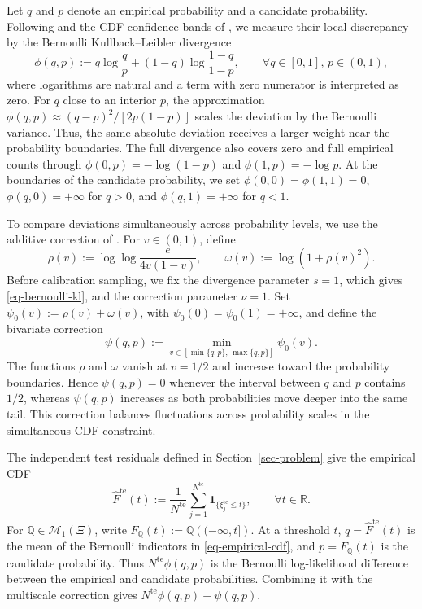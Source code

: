 \documentclass[review,11pt,3p,authoryear,nopreprintline]{elsarticle}
\begin{document}
Let $q$ and $p$ denote an empirical probability and a candidate probability. Following \citet{B.J79} and the CDF confidence bands of \citet{O95}, we measure their local discrepancy by the Bernoulli Kullback--Leibler divergence
\begin{equation}
  \phi(q,p):=q\log\frac{q}{p}+(1-q)\log\frac{1-q}{1-p},\qquad \forall q\in[0,1],\, p\in(0,1),
  \label{eq-bernoulli-kl}
\end{equation}
where logarithms are natural and a term with zero numerator is interpreted as zero. For $q$ close to an interior $p$, the approximation $\phi(q,p)\approx(q-p)^2/[2p(1-p)]$ scales the deviation by the Bernoulli variance. Thus, the same absolute deviation receives a larger weight near the probability boundaries. The full divergence also covers zero and full empirical counts through $\phi(0,p)=-\log(1-p)$ and $\phi(1,p)=-\log p$. At the boundaries of the candidate probability, we set $\phi(0,0)=\phi(1,1)=0$, $\phi(q,0)=+\infty$ for $q>0$, and $\phi(q,1)=+\infty$ for $q<1$.

To compare deviations simultaneously across probability levels, we use the additive correction of \citet{L.J23}. For $v\in(0,1)$, define
\begin{equation*}
  \rho(v):=\log\log\frac{e}{4v(1-v)},\qquad \omega(v):=\log\!\left(1+\rho(v)^2\right).
\end{equation*}
Before calibration sampling, we fix the divergence parameter $s=1$, which gives \eqref{eq-bernoulli-kl}, and the correction parameter $\nu=1$. Set $\psi_0(v):=\rho(v)+\omega(v)$, with $\psi_0(0)=\psi_0(1)=+\infty$, and define the bivariate correction
\begin{equation*}
  \psi(q,p):=\min_{v\in[\min\{q,p\},\,\max\{q,p\}]}\psi_0(v).
\end{equation*}
The functions $\rho$ and $\omega$ vanish at $v=1/2$ and increase toward the probability boundaries. Hence $\psi(q,p)=0$ whenever the interval between $q$ and $p$ contains $1/2$, whereas $\psi(q,p)$ increases as both probabilities move deeper into the same tail. This correction balances fluctuations across probability scales in the simultaneous CDF constraint.

The independent test residuals defined in Section~\ref{sec-problem} give the empirical CDF
\begin{equation}
  \widehat F^{\mathrm{te}}(t):=\frac{1}{N^{\mathrm{te}}}\sum_{j=1}^{N^{\mathrm{te}}}\mathbf 1_{\{\xi_j^{\mathrm{te}}\le t\}},\qquad \forall t\in\mathbb R.
  \label{eq-empirical-cdf}
\end{equation}
For $\mathbb Q\in\mathcal M_1(\Xi)$, write $F_{\mathbb Q}(t):=\mathbb Q\left(({-\infty},t]\right)$. At a threshold $t$, $q=\widehat F^{\mathrm{te}}(t)$ is the mean of the Bernoulli indicators in \eqref{eq-empirical-cdf}, and $p=F_{\mathbb Q}(t)$ is the candidate probability. Thus $N^{\mathrm{te}}\phi(q,p)$ is the Bernoulli log-likelihood difference between the empirical and candidate probabilities. Combining it with the multiscale correction gives $N^{\mathrm{te}}\phi(q,p)-\psi(q,p)$.
\end{document}
